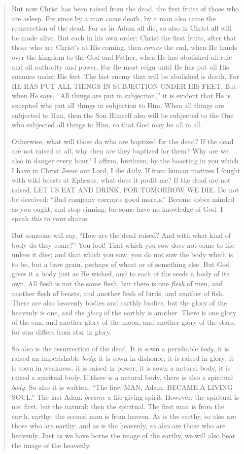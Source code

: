 \documentclass[
]{book}
\begin{document}
\begin{quote}
But now Christ has been raised from the dead, the first fruits of those who are asleep. For since by a man \emph{came} death, by a man also came the resurrection of the dead. For as in Adam all die, so also in Christ all will be made alive. But each in his own order: Christ the first fruits, after that those who are Christ's at His coming, then \emph{comes} the end, when He hands over the kingdom to the God and Father, when He has abolished all rule and all authority and power. For He must reign until He has put all His enemies under His feet. The last enemy that will be abolished is death. For HE HAS PUT ALL THINGS IN SUBJECTION UNDER HIS FEET. But when He says, ``All things are put in subjection,'' it is evident that He is excepted who put all things in subjection to Him. When all things are subjected to Him, then the Son Himself also will be subjected to the One who subjected all things to Him, so that God may be all in all.

Otherwise, what will those do who are baptized for the dead? If the dead are not raised at all, why then are they baptized for them? Why are we also in danger every hour? I affirm, brethren, by the boasting in you which I have in Christ Jesus our Lord, I die daily. If from human motives I fought with wild beasts at Ephesus, what does it profit me? If the dead are not raised, LET US EAT AND DRINK, FOR TOMORROW WE DIE. Do not be deceived: ``Bad company corrupts good morals.'' Become sober-minded as you ought, and stop sinning; for some have no knowledge of God. I speak \emph{this} to your shame.

But someone will say, ``How are the dead raised? And with what kind of body do they come?'' You fool! That which you sow does not come to life unless it dies; and that which you sow, you do not sow the body which is to be, but a bare grain, perhaps of wheat or of something else. But God gives it a body just as He wished, and to each of the seeds a body of its own. All flesh is not the same flesh, but there is one \emph{flesh} of men, and another flesh of beasts, and another flesh of birds, and another of fish. There are also heavenly bodies and earthly bodies, but the glory of the heavenly is one, and the \emph{glory} of the earthly is another. There is one glory of the sun, and another glory of the moon, and another glory of the stars; for star differs from star in glory.

So also is the resurrection of the dead. It is sown a perishable \emph{body}, it is raised an imperishable \emph{body}; it is sown in dishonor, it is raised in glory; it is sown in weakness, it is raised in power; it is sown a natural body, it is raised a spiritual body. If there is a natural body, there is also a spiritual \emph{body}. So also it is written, ``The first MAN, Adam, BECAME A LIVING SOUL.'' The last Adam \emph{became} a life-giving spirit. However, the spiritual is not first, but the natural; then the spiritual. The first man is from the earth, earthy; the second man is from heaven. As is the earthy, so also are those who are earthy; and as is the heavenly, so also are those who are heavenly. Just as we have borne the image of the earthy, we will also bear the image of the heavenly.


\end{quote}
\end{document}
